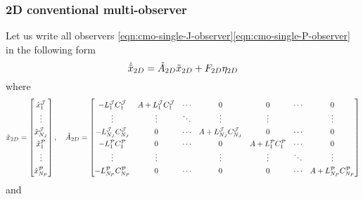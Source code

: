 \subsubsection{2D conventional multi-observer}
Let us write all observers \eqref{eqn:cmo-single-J-observer}\eqref{eqn:cmo-single-P-observer} in the following form
\begin{equation*}
    \dot{\Tilde{x}}_{2D} = \Tilde{A}_{2D}\Tilde{x}_{2D} + F_{2D}\eta_{2D}
\end{equation*}
where
\begin{equation}\label{eqn:2D-CMO-A-x}
\renewcommand{\arraystretch}{1.3}
    \begin{split}    
        \tilde{x}_{2D} &= 
        \begin{bmatrix}
            \hat{x}_1^{\mcJ} \\ \vdots \\ \hat{x}_{N_J}^{\mcJ} \\ \hat{x}_1^{\mcP} \\ \vdots \\ \hat{x}_{N_P}^{\mcP}
        \end{bmatrix}, \quad
        \tilde{A}_{2D} = 
        \begin{bmatrix}
            -L_1^{\mcJ}C_1^{\mcJ} & A + L_1^{\mcJ}C_1^{\mcJ} & \cdots & 0  & 0 & \cdots & 0 \\
            \vdots & \vdots & \ddots & \vdots & \vdots & & \vdots \\
            -L_{N_J}^{\mcJ}C_{N_J}^{\mcJ} & 0 & \cdots & A + L_{N_J}^{\mcJ}C_{N_J}^{\mcJ} & 0 & \cdots & 0 \\
            -L_{1}^{\mcP}C_{1}^{\mcP} & 0 & \cdots & 0 & A + L_1^{\mcP}C_1^{\mcP} & \cdots & 0 \\
            \vdots & \vdots &  & \vdots & \vdots & \ddots & \vdots \\
            -L_{N_P}^{\mcP}C_{N_P}^{\mcP} & 0 & \cdots & 0 & 0 & \cdots & A + L_{N_P}^{\mcP}C_{N_P}^{\mcP} \\
        \end{bmatrix} \\
    \end{split}
\end{equation}
and
